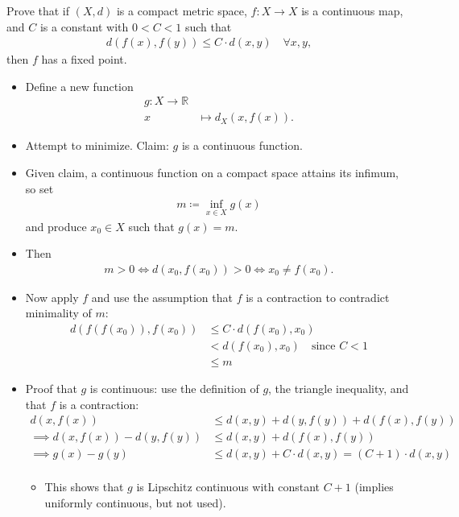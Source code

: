 Prove that if \((X, d)\) is a compact metric space, \(f : X \to X\) is a
continuous map, and \(C\) is a constant with \(0 < C < 1\) such that
\begin{align*}
d(f (x), f (y)) \leq C \cdot d(x, y) \quad \forall x, y
,\end{align*}
then \(f\) has a fixed point.

\begin{solution}

\hfill

\begin{concept}

\hfill

\end{concept}

\begin{itemize}
\item
  Define a new function
  \begin{align*}     g: X \to {\mathbb{R}}\\     x &\mapsto d_X(x, f(x))     .\end{align*}
\item
  Attempt to minimize. Claim: \(g\) is a continuous function.
\item
  Given claim, a continuous function on a compact space attains its
  infimum, so set
  \begin{align*}       m \coloneqq\inf_{x\in X} g(x)        \end{align*}
  and produce \(x_0\in X\) such that \(g(x) = m\).
\item
  Then
  \begin{align*}     m> 0 \iff d(x_0, f(x_0)) > 0 \iff x_0 \neq f(x_0)     .\end{align*}
\item
  Now apply \(f\) and use the assumption that \(f\) is a contraction to
  contradict minimality of \(m\):
  \begin{align*}     d(f(f(x_0)), f(x_0))      &\leq C\cdot d(f(x_0), x_0) \\      &< d(f(x_0), x_0) \quad\text{since } C<1\\     &\leq m     \end{align*}
\item
  Proof that \(g\) is continuous: use the definition of \(g\), the
  triangle inequality, and that \(f\) is a contraction:
  \begin{align*}     d(x, f(x)) &\leq d(x, y) + d(y, f(y)) + d(f(x), f(y)) \\     \implies d(x, f(x)) - d(y, f(y)) &\leq d(x, y) + d(f(x), f(y)) \\     \implies g(x) - g(y) &\leq d(x, y) + C\cdot d(x, y)  = (C+1) \cdot d(x, y)\\     \end{align*}

  \begin{itemize}
  \tightlist
  \item
    This shows that \(g\) is Lipschitz continuous with constant \(C+1\)
    (implies uniformly continuous, but not used).
  \end{itemize}
\end{itemize}

\end{solution}

